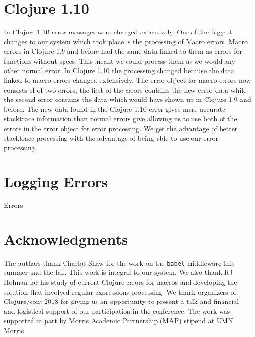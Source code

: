 \documentclass[12pt]{article}
\begin{document}
\section{Clojure 1.10}
In Clojure 1.10 error messages were changed extensively. 
One of the biggest changes to our system which took place is the processing of Macro errors. 
Macro errors in Clojure 1.9 and before had the same data linked to them as errors for functions without specs. 
This meant we could process them as we would any other normal error. 
In Clojure 1.10 the processing changed because the data linked to macro errors changed extensively. 
The error object for macro errors now consists of of two errors, the first of the errors contains the new error data while the second error contains the data which would have shown up in Clojure 1.9 and before. 
The new data found in the Clojure 1.10 error gives more accurate stacktrace information than normal errors give allowing us to use both of the errors in the error object for error processing. 
We get the advantage of better stacktrace processing with the advantage of being able to use our error processing.


\section{Logging Errors}
Errors

\section{Acknowledgments}
The authors thank Charlot Shaw for the work on the {\tt babel} middleware this summer and the fall. 
This work is integral to our system. We also thank RJ Holman for his study of current Clojure errors
for macros and developing the solution that involved regular expressions processing. 
We thank organizers of Clojure/conj 2018 for giving us an opportunity to present a talk 
and financial and logistical support of our participation in the conference. 
The work was supported in part by Morris Academic Partnership (MAP) stipend at UMN Morris.



\end{document}
